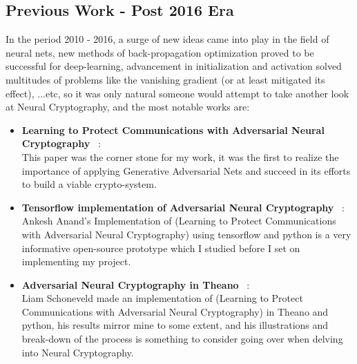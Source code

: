 \documentclass[a4paper, 12pt]{report}
\begin{document}
\subsection{\textbf{Previous Work - Post 2016 Era}}
In the period 2010 - 2016, a surge of new ideas came into play in the field of neural nets, new methods of back-propagation optimization proved to be successful for deep-learning, advancement in initialization and activation solved multitudes of problems like the vanishing gradient (or at least mitigated its effect), ...etc, so it was only natural someone would attempt to take another look at Neural Cryptography, and the most notable works are:
\begin{itemize}[nosep]
	\item \textbf{Learning to Protect Communications with Adversarial Neural Cryptography} ~\citep{DBLP:journals/corr/AbadiA16}:\\
	This paper was the corner stone for my work, it was the first to realize the importance of applying Generative Adversarial Nets and succeed in its efforts to build a viable crypto-system.
	\item \textbf{Tensorflow implementation of Adversarial Neural Cryptography} ~\citep{ankeshanand/neural-cryptography-tensorflow}:\\
	Ankesh Anand's Implementation of (Learning to Protect Communications with Adversarial Neural Cryptography) using tensorflow and python is a very informative open-source prototype which I studied before I set on implementing my project.
	\item \textbf{Adversarial Neural Cryptography in Theano} ~\citep{nlml/adversarial-neural-cryptography}:\\
	Liam Schoneveld made an implementation of (Learning to Protect Communications with Adversarial Neural Cryptography) in Theano and python, his results mirror mine to some extent, and his illustrations and break-down of the process is something to consider going over when delving into Neural Cryptography.
\end{itemize}
\newpage
\end{document}
